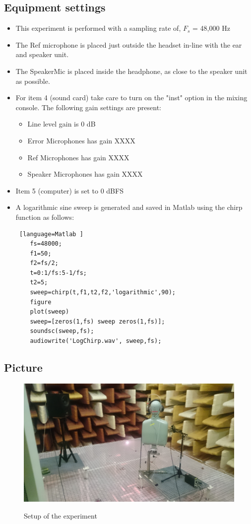 \subsection{Equipment settings}
\begin{itemize}
	\item This experiment is performed with a sampling rate of, $F_{s}$ = 48,000 Hz
	\item The Ref microphone is placed just outside the headset in-line with the ear and speaker unit. 
	\item The SpeakerMic is placed inside the headphone, as close to the speaker unit as possible. 
	\item For item 4 (sound card) take care to turn on the "inst" option in the mixing console. The following gain settings are present: 		
	\begin{itemize}
		\item Line level gain is 0 dB
		\item Error Microphones has gain XXXX
		\item Ref Microphones has gain XXXX
		\item Speaker Microphones has gain XXXX
	\end{itemize}
	\item Item 5 (computer) is set to 0 dBFS
	\item A logarithmic sine sweep is generated and saved in Matlab using the chirp function as follows:
	\begin{lstlisting} [language=Matlab	]
	fs=48000;
	f1=50;
	f2=fs/2;
	t=0:1/fs:5-1/fs;
	t2=5;
	sweep=chirp(t,f1,t2,f2,'logarithmic',90);
	figure
	plot(sweep)
	sweep=[zeros(1,fs) sweep zeros(1,fs)];
	soundsc(sweep,fs);
	audiowrite('LogChirp.wav', sweep,fs);
	\end{lstlisting}
\end{itemize}

\subsection{Picture}
\begin{figure}[H]
	\includegraphics[width=\textwidth]{../Journal/Experiments/AngleOfIncidence/AngInSetup.jpg}
	\label{AngIncidenceSetup}	
	\caption{Setup of the experiment}
\end{figure}


